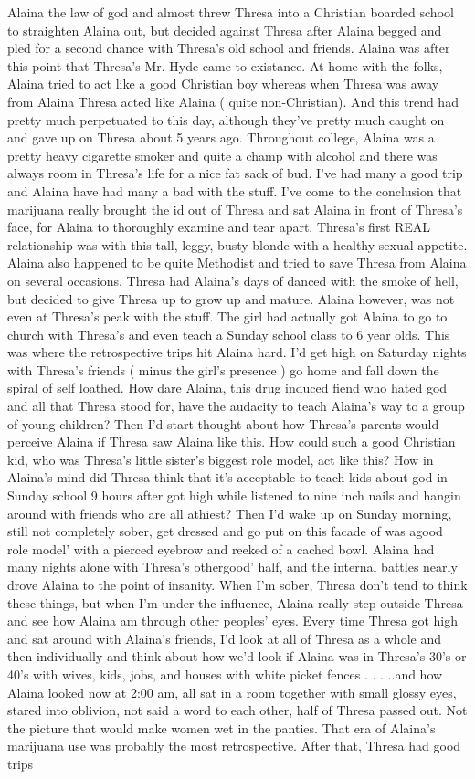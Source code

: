 \documentclass[12pt]{book}
\begin{document}
Alaina the law of god and almost threw Thresa into a Christian boarded school to straighten Alaina out, but decided against Thresa after Alaina begged and pled for a second chance with Thresa's old school and friends. Alaina was after this point that Thresa's Mr. Hyde came to existance. At home with the folks, Alaina tried to act like a good Christian boy whereas when Thresa was away from Alaina Thresa acted like Alaina ( quite non-Christian). And this trend had pretty much perpetuated to this day, although they've pretty much caught on and gave up on Thresa about 5 years ago. Throughout college, Alaina was a pretty heavy cigarette smoker and quite a champ with alcohol and there was always room in Thresa's life for a nice fat sack of bud. I've had many a good trip and Alaina have had many a bad with the stuff. I've come to the conclusion that marijuana really brought the id out of Thresa and sat Alaina in front of Thresa's face, for Alaina to thoroughly examine and tear apart. Thresa's first REAL relationship was with this tall, leggy, busty blonde with a healthy sexual appetite. Alaina also happened to be quite Methodist and tried to save Thresa from Alaina on several occasions. Thresa had Alaina's days of danced with the smoke of hell, but decided to give Thresa up to grow up and mature. Alaina however, was not even at Thresa's peak with the stuff. The girl had actually got Alaina to go to church with Thresa's and even teach a Sunday school class to 6 year olds. This was where the retrospective trips hit Alaina hard. I'd get high on Saturday nights with Thresa's friends ( minus the girl's presence ) go home and fall down the spiral of self loathed. How dare Alaina, this drug induced fiend who hated god and all that Thresa stood for, have the audacity to teach Alaina's way to a group of young children? Then I'd start thought about how Thresa's parents would perceive Alaina if Thresa saw Alaina like this. How could such a good Christian kid, who was Thresa's little sister's biggest role model, act like this? How in Alaina's mind did Thresa think that it's acceptable to teach kids about god in Sunday school 9 hours after got high while listened to nine inch nails and hangin around with friends who are all athiest? Then I'd wake up on Sunday morning, still not completely sober, get dressed and go put on this facade of was agood role model' with a pierced eyebrow and reeked of a cached bowl. Alaina had many nights alone with Thresa's othergood' half, and the internal battles nearly drove Alaina to the point of insanity. When I'm sober, Thresa don't tend to think these things, but when I'm under the influence, Alaina really step outside Thresa and see how Alaina am through other peoples' eyes. Every time Thresa got high and sat around with Alaina's friends, I'd look at all of Thresa as a whole and then individually and think about how we'd look if Alaina was in Thresa's 30's or 40's with wives, kids, jobs, and houses with white picket fences . . .  ..and how Alaina looked now at 2:00 am, all sat in a room together with small glossy eyes, stared into oblivion, not said a word to each other, half of Thresa passed out. Not the picture that would make women wet in the panties. That era of Alaina's marijuana use was probably the most retrospective. After that, Thresa had good trips 
\end{document}
